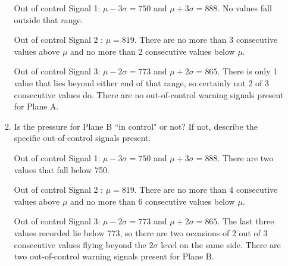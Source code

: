 \documentclass{article}
\newcommand{\answer}[1]{\color{red}#1}
\begin{document}
\begin{enumerate}
\begin{enumerate}
	{\answer Out of control Signal 1: $\mu -3\sigma = 750$ and $\mu +3\sigma = 888$.  No values fall outside that range. 
	
	Out of control Signal 2 : $\mu = 819$.  There are no more than 3 consecutive values above $\mu$ and no more than 2 consecutive values below $\mu$.
	
	Out of control Signal 3: $\mu -2\sigma = 773$ and $\mu +2\sigma = 865$.  There is only 1 value that lies beyond either end of that range, so certainly not 2 of 3 consecutive values do. There are no out-of-control warning signals present for Plane A.} 
	
	\item  Is the pressure for Plane B ``in control" or not?  If not, describe the specific out-of-control signals present.
	
	{\answer Out of control Signal 1: $\mu -3\sigma = 750$ and $\mu +3\sigma = 888$.  There are two values that fall below 750. 
	
	Out of control Signal 2 : $\mu = 819$.  There are no more than 4 consecutive values above $\mu$ and no more than 6 consecutive values below $\mu$. 
	
	Out of control Signal 3: $\mu -2\sigma = 773$ and $\mu +2\sigma = 865$.  The last three values recorded lie below 773, so there are two occasions of 2 out of 3 consecutive values flying beyond the $2\sigma$ level on the same side. There are two out-of-control warning signals present for Plane B.} 
	\end{enumerate}
	
	



\end{enumerate}
\end{document}
